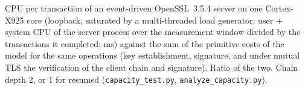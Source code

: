 \documentclass[11pt]{article}
\begin{document}
\begin{table}[!htbp]\centering\small
\caption{CPU per transaction of an event-driven OpenSSL~3.5.4 server on one Cortex-X925 core (loopback, saturated by a multi-threaded load generator; user + system CPU of the server process over the measurement window divided by the transactions it completed; ms) against the sum of the primitive costs of the model for the same operations (key establishment, signature, and under mutual TLS the verification of the client chain and signature). Ratio of the two. Chain depth 2, or 1 for resumed (\texttt{capacity\_test.py}, \texttt{analyze\_capacity.py}).}
\resizebox{\textwidth}{!}{}
\end{table}
\end{document}
